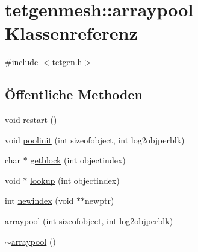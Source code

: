 \hypertarget{classtetgenmesh_1_1arraypool}{\section{tetgenmesh\-:\-:arraypool Klassenreferenz}
\label{classtetgenmesh_1_1arraypool}
}


{\ttfamily \#include $<$tetgen.\-h$>$}

\subsection*{Öffentliche Methoden}
\begin{DoxyCompactItemize}
\item 
void \hyperlink{classtetgenmesh_1_1arraypool_a19030126ef81a9ff3c4aca35f0347cdc}{restart} ()
\item 
void \hyperlink{classtetgenmesh_1_1arraypool_a3069be62301a28c1e89201008e838cf8}{poolinit} (int sizeofobject, int log2objperblk)
\item 
char $\ast$ \hyperlink{classtetgenmesh_1_1arraypool_a3389d606b99e572c2d381fa51bc3793b}{getblock} (int objectindex)
\item 
void $\ast$ \hyperlink{classtetgenmesh_1_1arraypool_af7ead1b15097f61c7082568ce1121f05}{lookup} (int objectindex)
\item 
int \hyperlink{classtetgenmesh_1_1arraypool_afb546c70f7728e3e0d58e2aada464437}{newindex} (void $\ast$$\ast$newptr)
\item 
\hyperlink{classtetgenmesh_1_1arraypool_a62a21b86eafefd79c951e85a9b180d0f}{arraypool} (int sizeofobject, int log2objperblk)
\item 
\hyperlink{classtetgenmesh_1_1arraypool_ad35fa12ece8de7d6b567baf9af8d7200}{$\sim$arraypool} ()
\end{DoxyCompactItemize}
